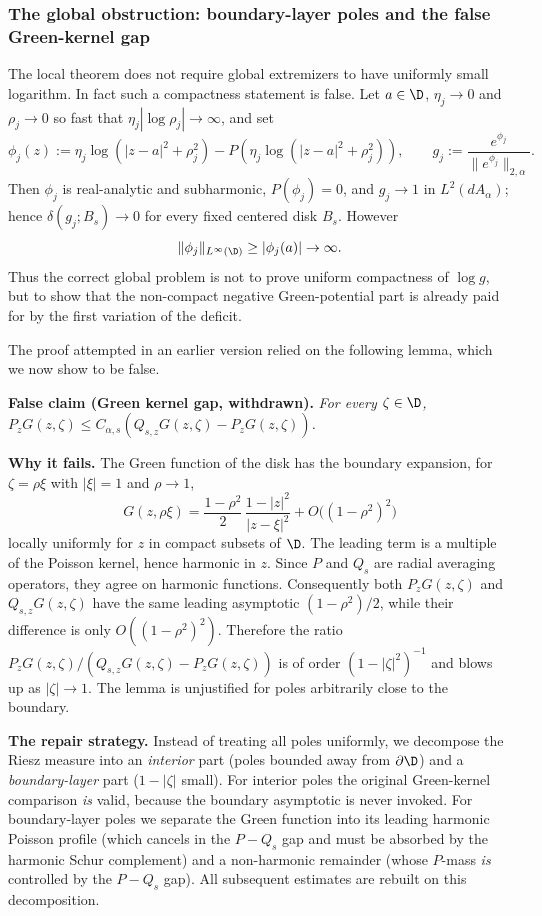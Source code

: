 \subsubsection*{The global obstruction: boundary-layer poles and the false Green-kernel gap}

The local theorem does not require global extremizers to have uniformly small
logarithm. In fact such a compactness statement is false. Let
$a\in\D$, $\eta_j\to0$ and $\rho_j\to0$ so fast that
$\eta_j|\log\rho_j|\to\infty$, and set
\[
\phi_j(z)
:=
\eta_j\log(|z-a|^2+\rho_j^2)-P\!\left(\eta_j\log(|z-a|^2+\rho_j^2)\right),
\qquad
g_j:=\frac{e^{\phi_j}}{\|e^{\phi_j}\|_{2,\alpha}}.
\]
Then $\phi_j$ is real-analytic and subharmonic, $P(\phi_j)=0$, and
$g_j\to1$ in $L^2(dA_\alpha)$; hence $\delta(g_j;B_s)\to0$ for every fixed
centered disk $B_s$. However
\[
\|\phi_j\|_{L^\infty(\D)}\ge |\phi_j(a)|\to\infty.
\]
Thus the correct global problem is not to prove uniform compactness of
$\log g$, but to show that the non-compact negative Green-potential part is
already paid for by the first variation of the deficit.

The proof attempted in an earlier version relied on the following lemma,
which we now show to be false.

\medskip
\noindent\textbf{False claim (Green kernel gap, withdrawn).}
{\itshape
For every $\zeta\in\D$,
$P_zG(z,\zeta)\le C_{\alpha,s}(Q_{s,z}G(z,\zeta)-P_zG(z,\zeta))$.
}

\medskip
\noindent\textbf{Why it fails.}
The Green function of the disk has the boundary expansion, for
$\zeta=\rho\xi$ with $|\xi|=1$ and $\rho\to1$,
\[
G(z,\rho\xi)
=
\frac{1-\rho^2}{2}\,
\frac{1-|z|^2}{|z-\xi|^2}
+O\bigl((1-\rho^2)^2\bigr)
\]
locally uniformly for $z$ in compact subsets of $\D$.
The leading term is a multiple of the Poisson kernel, hence harmonic in $z$.
Since $P$ and $Q_s$ are radial averaging operators, they agree on harmonic
functions. Consequently both $P_zG(z,\zeta)$ and $Q_{s,z}G(z,\zeta)$ have the
same leading asymptotic $(1-\rho^2)/2$, while their difference is only
$O((1-\rho^2)^2)$. Therefore the ratio
$P_zG(z,\zeta)/(Q_{s,z}G(z,\zeta)-P_zG(z,\zeta))$ is of order
$(1-|\zeta|^2)^{-1}$ and blows up as $|\zeta|\to1$.
The lemma is unjustified for poles arbitrarily close to the boundary.

\medskip
\noindent\textbf{The repair strategy.}
Instead of treating all poles uniformly, we decompose the Riesz measure into
an \emph{interior} part (poles bounded away from $\partial\D$) and a
\emph{boundary-layer} part ($1-|\zeta|$ small).  For interior poles the
original Green-kernel comparison \emph{is} valid, because the boundary
asymptotic is never invoked.  For boundary-layer poles we separate the Green
function into its leading harmonic Poisson profile (which cancels in the
$P-Q_s$ gap and must be absorbed by the harmonic Schur complement) and a
non-harmonic remainder (whose $P$-mass \emph{is} controlled by the
$P-Q_s$ gap).  All subsequent estimates are rebuilt on this decomposition.


